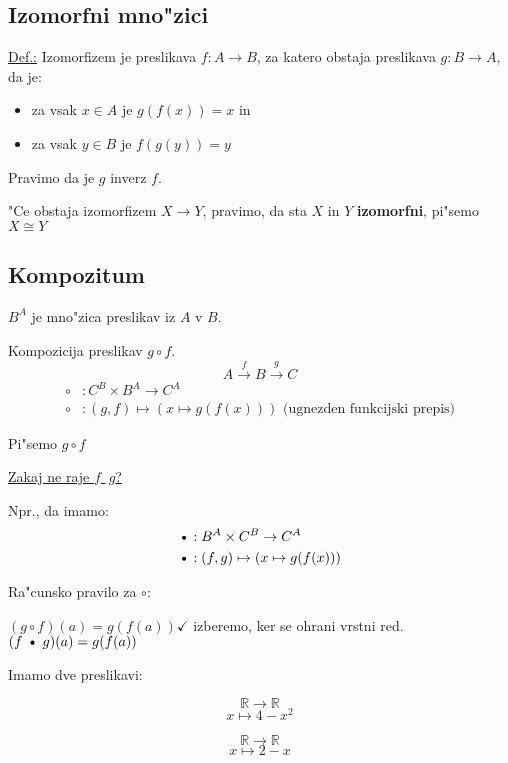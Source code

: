 \subsection{Izomorfni mno"zici}
\underline{Def.:} Izomorfizem je preslikava \(f: A \rightarrow B\), za katero obstaja preslikava \(g: B \rightarrow A\), da je:
\begin{itemize}
	\item za vsak \(x \in A\) je \(g(f(x)) = x\) in
	\item za vsak \(y \in B\) je \(f(g(y)) = y\)
\end{itemize}

Pravimo da je \(g\) inverz \(f\).

"Ce obstaja izomorfizem \(X \rightarrow Y\), pravimo, da sta \(X\) in \(Y\) \textbf{izomorfni}, pi"semo \(X \cong Y\)

\subsection{Kompozitum}
\(B^A\) je mno"zica preslikav iz \(A\) v \(B\).

Kompozicija preslikav \(g \circ f\).
\[A \stackrel{f}{\rightarrow} B \stackrel{g}{\rightarrow} C\]
\begin{align*}
	\circ&: C^B \times B^A \rightarrow C^A\\
	\circ&: (g, f) \mapsto (x \mapsto g(f(x))) \text{ (ugnezden funkcijski prepis)}
\end{align*}

Pi"semo \(g \circ f\)

\underline{Zakaj ne raje \(f\) \textbullet \(\ g\)?} 

Npr., da imamo:
\begin{align*}
	\text{\textbullet}&: B^A \times C^B \rightarrow C^A\\
	\text{\textbullet}&: (f, g) \mapsto (x \mapsto g(f(x)))
\end{align*}

Ra"cunsko pravilo za \(\circ\):

\((g \circ f)(a) = g(f(a)) \checkmark\) izberemo, ker se ohrani vrstni red.\\
\((f \text{ \textbullet }\ g)(a) = g(f(a))\)

Imamo dve preslikavi:
\begin{multicols}{2}
	\[\mathbb{R} \rightarrow \mathbb{R}\]
	\[x \mapsto 4 - x^2\]
	
	\columnbreak
	\[\mathbb{R} \rightarrow \mathbb{R}\]
	\[x \mapsto 2 - x\]
\end{multicols}


